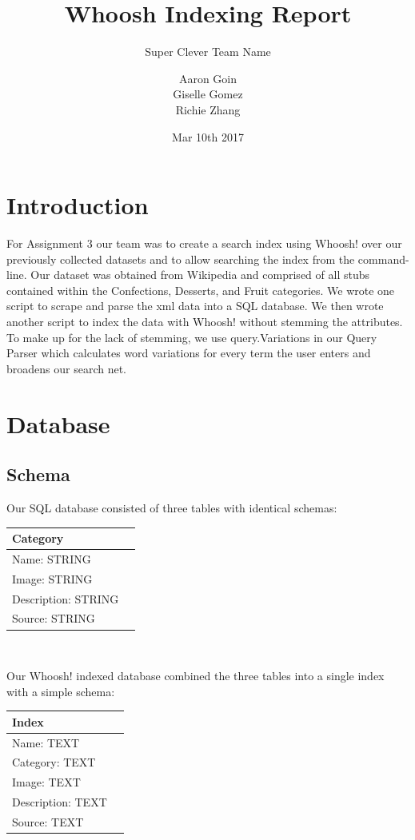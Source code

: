 \documentclass[12pt, oneside]{scrreprt}
\title{Whoosh Indexing Report}
\subtitle{Super Clever Team Name}
\author{Aaron Goin\\Giselle Gomez\\Richie Zhang}
\date{Mar 10th 2017}
\begin{document}
\maketitle

\pagebreak

\section*{Introduction}
For Assignment 3 our team was to create a search index using Whoosh! over our previously collected datasets and to allow searching the index from the command-line. Our dataset was obtained from Wikipedia and comprised of all stubs contained within the Confections, Desserts, and Fruit categories. We wrote one script to scrape and parse the xml data into a SQL database. We then wrote another script to index the data with Whoosh! without stemming the attributes. To make up for the lack of stemming, we use query.Variations in our Query Parser which calculates word variations for every term the user enters and broadens our search net.

\section*{Database}
\subsection*{Schema}
Our SQL database consisted of three tables with identical schemas: \\

\begin{center}
 \begin{tabular}{|l c ||}
    \hline
    Category \\
    \hline
    Name: STRING \\
    Image: STRING \\
    Description: STRING \\
    Source: STRING \\
    \hline
  \end{tabular} \\
\end{center}

Our Whoosh! indexed database combined the three tables into a single index with a simple schema: \\

\begin{center}
  \begin{tabular}{|l c ||}
    \hline
    Index \\ \hline
    Name: TEXT \\
    Category: TEXT \\
    Image: TEXT \\
    Description: TEXT \\
    Source: TEXT \\
    \hline
  \end{tabular}
\end{center} 
\end{document}
